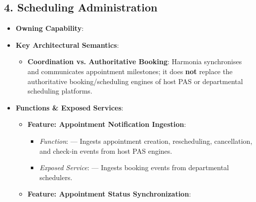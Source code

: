 \par\smallskip
{}\label{rad:sa:47}
\subsection*{4. Scheduling Administration}
\label{rad:sa:48}

\begin{itemize}

\item
\textbf{Owning Capability}: \texttt{}



\item
\textbf{Key Architectural Semantics}:


\begin{itemize}

\item
\textbf{Coordination vs. Authoritative Booking}: Harmonia synchronises and communicates appointment milestones; it does \textbf{not} replace the authoritative booking/\allowbreak{}scheduling engines of host PAS or departmental scheduling platforms.



\end{itemize}


\item
\textbf{Functions \& Exposed Services}:


\begin{itemize}

\item
\textbf{Feature: Appointment Notification Ingestion}:


\begin{itemize}

\item
\emph{Function}: \texttt{} — Ingests appointment creation, rescheduling, cancellation, and check-in events from host PAS engines.



\item
\emph{Exposed Service}: \texttt{} — Ingests booking events from departmental schedulers.



\end{itemize}


\item
\textbf{Feature: Appointment Status Synchronization}:



\end{itemize}
\end{itemize}
